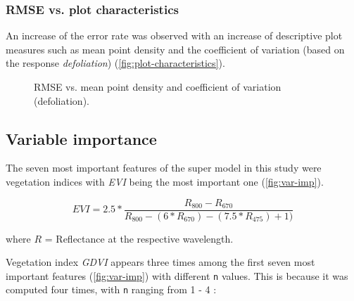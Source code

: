 \documentclass[review]{elsarticle}
\begin{document}
\subsubsection{RMSE vs. plot characteristics}

\noindent An increase of the error rate was observed with an increase of descriptive plot measures such as mean point density and the coefficient of variation (based on the response \textit{defoliation}) (\autoref{fig:plot-characteristics}). 

\begin{figure} [b!]
	\begin{center}
		\caption{RMSE vs. mean point density and coefficient of variation (defoliation).}
		\label{fig:plot-characteristics}
	\end{center}
\end{figure}

\subsection{Variable importance}

\noindent The seven most important features of the super model in this study were vegetation indices with \textit{EVI} \citep{hueteComparisonVegetationIndices1997} being the most important one (\autoref{fig:var-imp}).

\begin{equation}
	EVI = 2.5*\frac{R_{800}-R_{670}}{R_{800}-(6*R_{670})-(7.5*R_{475})+1)}
\end{equation}

\noindent where $R$ = Reflectance at the respective wavelength.

\bigbreak

\noindent Vegetation index \textit{GDVI} appears three times among the first seven most important features (\autoref{fig:var-imp}) with different \texttt{n} values.
This is because it was computed four times, with \texttt{n} ranging from 1 - 4 \citep{wuEstimatingChlorophyllContent2008}:
\end{document}

